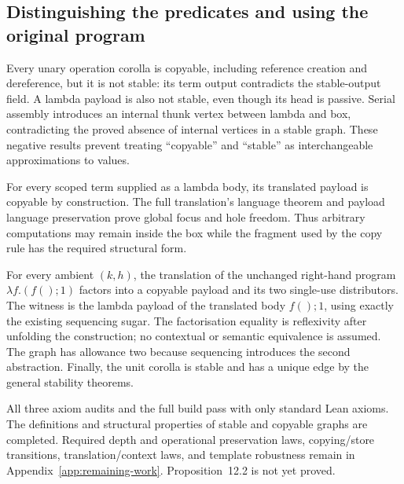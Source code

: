 

\subsection{Distinguishing the predicates and using the original program}

Every unary operation corolla is copyable, including reference creation
and dereference, but it is not stable: its term output contradicts the
stable-output field. A lambda payload is also not stable, even though its
head is passive. Serial assembly introduces an internal thunk vertex between
lambda and box, contradicting the proved absence of internal vertices in
a stable graph. These negative results prevent treating ``copyable'' and
``stable'' as interchangeable approximations to values.

For every scoped term supplied as a lambda body, its translated payload
is copyable by construction. The full translation's language theorem and
payload language preservation prove global focus and hole freedom. Thus
arbitrary computations may remain inside the box while the fragment used
by the copy rule has the required structural form.




For every ambient $(k,h)$, the translation of the unchanged right-hand
program $\lambda f.(f();1)$ factors into a copyable payload and its two
single-use distributors. The witness is the lambda payload of the translated
body $f();1$, using exactly the existing sequencing sugar. The factorisation
equality is reflexivity after unfolding the construction; no contextual
or semantic equivalence is assumed. The graph has allowance two because
sequencing introduces the second abstraction. Finally, the unit corolla
is stable and has a unique edge by the general stability theorems.




All three axiom audits and the full build pass with only standard Lean
axioms. The definitions and structural properties of stable and copyable
graphs are completed. Required depth and operational preservation laws,
copying/store transitions, translation/context laws, and template robustness
remain in Appendix~\ref{app:remaining-work}. Proposition~12.2 is not yet proved.
